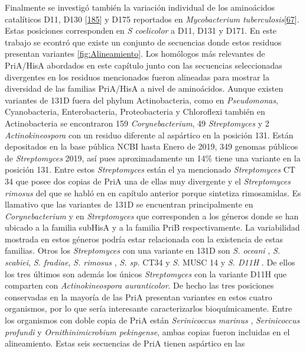 \documentclass[12pt,twoside]{reedthesis}
\begin{document}
  Finalmente se investigó también la variación individual de los
  aminoácidos catalíticos D11, D130
  {[}\protect\hyperlink{ref-due_bisubstrate_2011}{185}{]} y D175
  reportados en \emph{Mycobacterium
  tuberculosis}{[}\protect\hyperlink{ref-verduzco-castro_co-occurrence_2016}{67}{]}.
  Estas posiciones corresponden en \emph{S coelicolor} a D11, D131 y D171.
  En este trabajo se econtró que existe un conjunto de secuencias donde
  estos residuos presentan variantes \autoref{fig:Alineamiento}. Los
  homólogos más relevantes de PriA/HisA abordados en este capítulo junto
  con las secuencias seleccionadas divergentes en los residuos mencionados
  fueron alineadas para mostrar la diversidad de las familias PriA/HisA a
  nivel de aminoácidos. Aunque existen variantes de 131D fuera del phylum
  Actinobacteria, como en \emph{Pseudomonas}, Cyanobacteria,
  Enterobacteria, Proteobacteria y Chloroflexi también en Actinobacteria
  se encontraron 159 \emph{Corynebacterium}, 49 \emph{Streptomyces} y 2
  \emph{Actinokineospora} con un residuo diferente al aspártico en la
  posición 131. Están depositados en la base pública NCBI hasta Enero de
  2019, 349 genomas públicos de \emph{Streptomyces} 2019, así pues
  aproximadamente un 14\% tiene una variante en la posición 131. Entre
  estos \emph{Streptomyces} están el ya mencionado \emph{Streptomyces } CT
  34 que posee dos copias de PriA una de ellas muy divergente y el
  \emph{Streptomyces rimosus} del que se habló en en capítulo anterior
  porque sintetiza rimosamidas. Es llamativo que las variantes de 131D se
  encuentran principalmente en \emph{Corynebacterium} y en
  \emph{Streptomyces} que corresponden a los géneros donde se han ubicado
  a la familia subHisA y a la familia PriB respectivamente. La
  variabilidad mostrada en estos géneros podría estar relacionada con la
  existencia de estas familias. Otros los \emph{Streptomyces} con una
  variante en 131D son \emph{S. oceani} , \emph{S. scabiei}, \emph{S.
  fradiae}, \emph{S. rimosus} , \emph{S. sp.} CT34 y \emph{S. } MUSC 14 y
  \emph{S. D11H} . De ellos los tres últimos son además los únicos
  \emph{Streptomyces} con la variante D11H que comparten con
  \emph{Actinokineospora auranticolor}. De hecho las tres posiciones
  conservadas en la mayoría de las PriA presentan variantes en estos
  cuatro organismos, por lo que sería interesante caracterizarlos
  bioquímicamente. Entre los organismos con doble copia de PriA están
  \emph{Serinicoccus marinus} , \emph{Serinicoccus profundi} y
  \emph{Ornithinimicrobium pekingense}, ambas copias fueron incluidas en
  el alineamiento. Estas seis secuencias de PriA tienen aspártico en las
\end{document}
